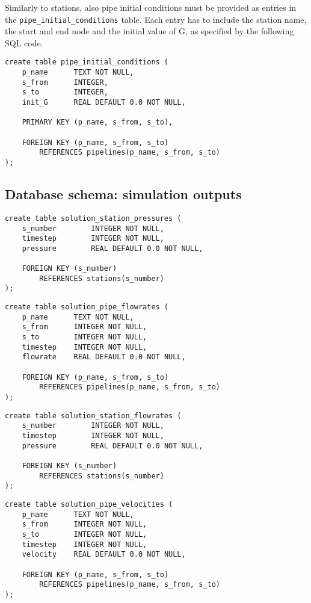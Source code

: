 \documentclass[10pt]{article}
\begin{document}
Similarly to stations, also pipe initial conditions must be provided as entries
in the \texttt{pipe\_initial\_conditions} table. Each entry has to include the
station name, the start and end node and the initial value of G, as specified
by the following SQL code.
\begin{verbatim}
create table pipe_initial_conditions (
    p_name      TEXT NOT NULL,
    s_from      INTEGER,
    s_to        INTEGER,
    init_G      REAL DEFAULT 0.0 NOT NULL,
    
    PRIMARY KEY (p_name, s_from, s_to),

    FOREIGN KEY (p_name, s_from, s_to)
        REFERENCES pipelines(p_name, s_from, s_to)
);
\end{verbatim}
\subsection{Database schema: simulation outputs}

\begin{verbatim}
create table solution_station_pressures (
    s_number        INTEGER NOT NULL,
    timestep        INTEGER NOT NULL,
    pressure        REAL DEFAULT 0.0 NOT NULL,
    
    FOREIGN KEY (s_number)
        REFERENCES stations(s_number)
);
\end{verbatim}

\begin{verbatim}
create table solution_pipe_flowrates (
    p_name      TEXT NOT NULL,
    s_from      INTEGER NOT NULL,
    s_to        INTEGER NOT NULL,
    timestep    INTEGER NOT NULL,
    flowrate    REAL DEFAULT 0.0 NOT NULL,

    FOREIGN KEY (p_name, s_from, s_to)
        REFERENCES pipelines(p_name, s_from, s_to)
);
\end{verbatim}

\begin{verbatim}
create table solution_station_flowrates (
    s_number        INTEGER NOT NULL,
    timestep        INTEGER NOT NULL,
    pressure        REAL DEFAULT 0.0 NOT NULL,
    
    FOREIGN KEY (s_number)
        REFERENCES stations(s_number)
);
\end{verbatim}

\begin{verbatim}
create table solution_pipe_velocities (
    p_name      TEXT NOT NULL,
    s_from      INTEGER NOT NULL,
    s_to        INTEGER NOT NULL,
    timestep    INTEGER NOT NULL,
    velocity    REAL DEFAULT 0.0 NOT NULL,

    FOREIGN KEY (p_name, s_from, s_to)
        REFERENCES pipelines(p_name, s_from, s_to)
);
\end{verbatim}
\end{document}
